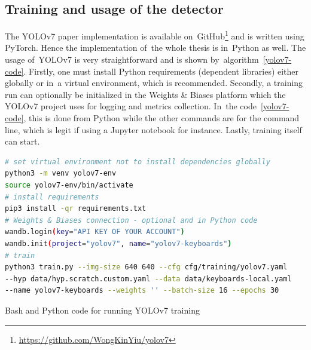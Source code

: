 \subsection{Training and usage of the detector}
\label{design-keyboard-implementation}
The YOLOv7 paper implementation is available on~GitHub\footnote[1]{\url{https://github.com/WongKinYiu/yolov7}} and is written using \hbox{PyTorch}. Hence the implementation of~the whole thesis is in~Python as well. The usage of~YOLOv7 is very straightforward and is shown by~algorithm~\ref{yolov7-code}. Firstly, one must install Python requirements (dependent libraries) either globally or in~a virtual environment, which is recommended. Secondly, a training run can optionally be initialized in the Weights \& Biases platform which the YOLOv7 project uses for logging and metrics collection. In~the code~\ref{yolov7-code}, this is done from Python while the other commands are for the command line, which is legit if using a Jupyter notebook for instance. Lastly, training itself can start.

\begin{algorithm}[!hbt]
    \begin{lstlisting}[language=bash, keywords={python3, pip3, source}]
# set virtual environment not to install dependencies globally
python3 -m venv yolov7-env
source yolov7-env/bin/activate
# install requirements
pip3 install -qr requirements.txt
# Weights & Biases connection - optional and in Python code
wandb.login(key="API KEY OF YOUR ACCOUNT")
wandb.init(project="yolov7", name="yolov7-keyboards")
# train
python3 train.py --img-size 640 640 --cfg cfg/training/yolov7.yaml
--hyp data/hyp.scratch.custom.yaml --data data/keyboards-local.yaml
--name yolov7-keyboards --weights '' --batch-size 16 --epochs 30
    \end{lstlisting}
    \caption{Bash and Python code for running YOLOv7 training}
    \label{yolov7-code}
\end{algorithm}

